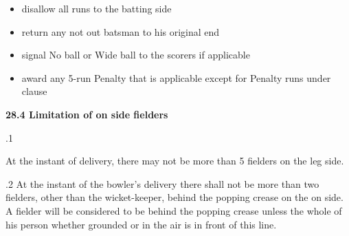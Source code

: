 \documentclass[12pt]{article}
\begin{document}
\vspace{\baselineskip}
\begin{itemize}
	\item {\fontsize{9pt}{10.8pt}\selectfont disallow all runs to the batting side\par}\par


\vspace{\baselineskip}
	\item {\fontsize{9pt}{10.8pt}\selectfont return any not out batsman to his original end\par}\par


\vspace{\baselineskip}
	\item {\fontsize{9pt}{10.8pt}\selectfont signal No ball or Wide ball to the scorers if applicable\par}\par


\vspace{\baselineskip}
	\item {\fontsize{9pt}{10.8pt}\selectfont award any 5-run Penalty that is applicable except for Penalty runs under clause \par}
\end{itemize}\par


\vspace{\baselineskip}
{\fontsize{11pt}{13.2pt}\selectfont \textbf{28.4 \tabto{0.47in} Limitation of on side fielders}\par}\par


\vspace{\baselineskip}
{\fontsize{9pt}{10.8pt}.1 \tabto{0.49in} {\fontsize{8pt}{9.6pt}\selectfont At the instant of delivery, there may not be more than 5 fielders on the leg side.\par}\par}\par


\vspace{\baselineskip}
\begin{adjustwidth}{0.5in}{0.03in}
{\fontsize{9pt}{10.8pt}.2 \tabto{0.49in} At the instant of the bowler’s delivery there shall not be more than two fielders, other than the wicket-keeper, behind the popping crease on the on side. A fielder will be considered to be behind the popping crease unless the whole of his person whether grounded or in the air is in front of this line.\par}\par

\end{adjustwidth}
\end{document}
